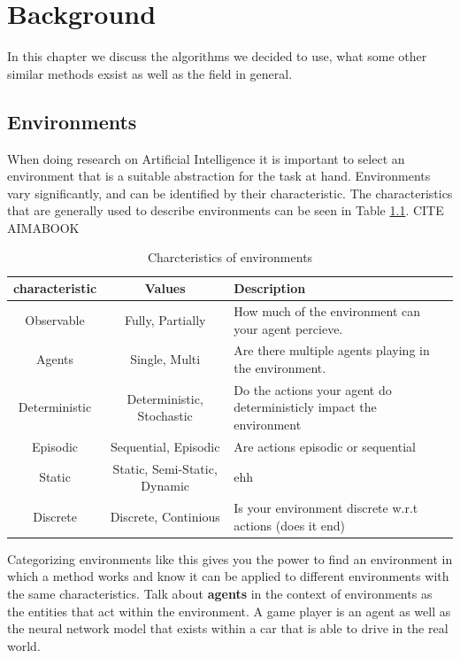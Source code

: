 \chapter{Background\label{cha:background}}

In this chapter we discuss the algorithms we decided to use, what some other similar 
methods exsist as well as the field in general.

\section{Environments}
\label{sec:environments}

When doing research on Artificial Intelligence it is important to select 
an environment that is a suitable abstraction for the task at hand. Environments vary 
significantly, and can be identified by their characteristic. The characteristics 
that are generally used to describe environments can be seen in Table \ref{tab:env_characteristics}. 
CITE AIMABOOK

\begin{table}[h]
  \centering
  \begin{tabular}{|c|c|p{6cm}|}
    \hline
    \textbf{characteristic} & \textbf{Values} & \textbf{Description}\\
    \hline
    Observable & Fully, Partially & How much of the environment can your agent percieve.\\
    \hline
    Agents & Single, Multi & Are there multiple agents playing in the environment.\\
    \hline
    Deterministic & Deterministic, Stochastic & Do the actions your agent do deterministicly impact the environment\\
    \hline
    Episodic & Sequential, Episodic & Are actions episodic or sequential\\
    \hline
    Static & Static, Semi-Static, Dynamic & ehh  \\
    \hline
    Discrete & Discrete, Continious & Is your environment discrete w.r.t actions (does it end) \\
    \hline
  \end{tabular}
  \caption{Charcteristics of environments}
  \label{tab:env_characteristics}
\end{table}

Categorizing environments like this gives you the power to find an environment in which 
a method works and know it can be applied to different environments with the same characteristics.
Talk about \textbf{agents} in the context of environments as the entities that act within the 
environment. A game player is an agent as well as the neural network model that exists within 
a car that is able to drive in the real world.

